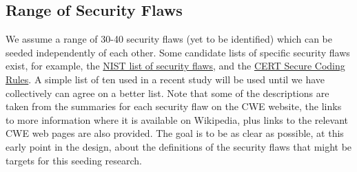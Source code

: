 \subsection{Range of Security Flaws}
         We assume a range of 30-40 security flaws (yet to be identified)
         which can be seeded independently of each other.  Some candidate lists of
         specific security flaws exist,
         for example, the \href{http://nvd.nist.gov/cwe.cfm}{NIST list of security flaws}, 
         and the 
         \href{https://www.securecoding.cert.org/confluence/display/seccode/CERT+Secure+Coding+Standards}{CERT Secure Coding Rules}.
         A simple list of ten used in a recent study will be used until we have
         collectively can agree on a better list. Note that some of the descriptions
         are taken from the summaries for each security flaw on the CWE website, the 
         links to more information where it is available on Wikipedia, plus
         links to the relevant CWE web pages are also provided.  The goal is to be
         as clear as possible, at this early point in the design, about the definitions of
         the security flaws that might be targets for this seeding research.
